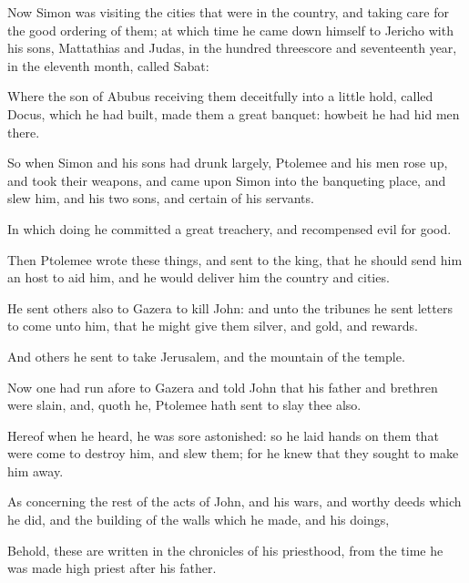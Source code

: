 {\par }{\PP {}Now Simon was visiting the cities that were in the country, and taking care for the good ordering of them; at which time he came down himself to Jericho with his sons, Mattathias and Judas, in the hundred threescore and seventeenth year, in the eleventh month, called Sabat:
\par }{\PP {}Where the son of Abubus receiving them deceitfully into a little hold, called Docus, which he had built, made them a great banquet: howbeit he had hid men there.
\par }{\PP {}So when Simon and his sons had drunk largely, Ptolemee and his men rose up, and took their weapons, and came upon Simon into the banqueting place, and slew him, and his two sons, and certain of his servants.
\par }{\PP {}In which doing he committed a great treachery, and recompensed evil for good.
\par }{\PP {}Then Ptolemee wrote these things, and sent to the king, that he should send him an host to aid him, and he would deliver him the country and cities.
\par }{\PP {}He sent others also to Gazera to kill John: and unto the tribunes he sent letters to come unto him, that he might give them silver, and gold, and rewards.
\par }{\PP {}And others he sent to take Jerusalem, and the mountain of the temple.
\par }{\PP {}Now one had run afore to Gazera and told John that his father and brethren were slain, and, quoth he, Ptolemee hath sent to slay thee also.
\par }{\PP {}Hereof when he heard, he was sore astonished: so he laid hands on them that were come to destroy him, and slew them; for he knew that they sought to make him away.
\par }{\PP {}As concerning the rest of the acts of John, and his wars, and worthy deeds which he did, and the building of the walls which he made, and his doings,
\par }{\PP {}Behold, these are written in the chronicles of his priesthood, from the time he was made high priest after his father.
\par }